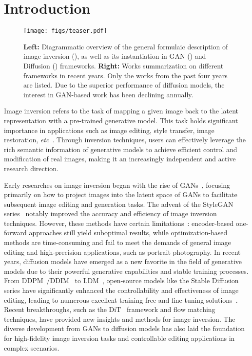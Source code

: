 \section{Introduction} \label{sec:introduction}



\begin{figure*}[thp]
    \centering
    \texttt{[image: figs/teaser.pdf]}
    \vspace{-2.0em}
    \caption{
    \textbf{Left:} Diagrammatic overview of the general formulaic description of image inversion (\textbf{\uppercase\expandafter{}}), as well as its instantiation in GAN (\textbf{\uppercase\expandafter{}}) and Diffusion (\textbf{\uppercase\expandafter{}}) frameworks. 
    \textbf{Right:} Works summarization on different frameworks in recent years. 
    Only the works from the past four years are listed. Due to the superior performance of diffusion models, the interest in GAN-based work has been declining annually. 
    }
    \vspace{-1.5em}
    \label{fig:teaser}
\end{figure*}


Image inversion refers to the task of mapping a given image back to the latent representation with a pre-trained generative model. This task holds significant importance in applications such as image editing, style transfer, image restoration, \textit{etc}~\cite{survey1,survey2}. Through inversion techniques, users can effectively leverage the rich semantic information of generative models to achieve efficient control and modification of real images, making it an increasingly independent and active research direction.

Early researches on image inversion began with the rise of GANs~\cite{iGAN}, focusing primarily on how to project images into the latent space of GANs to facilitate subsequent image editing and generation tasks. The advent of the StyleGAN series~\cite{StyleGAN,StyleGAN2} notably improved the accuracy and efficiency of image inversion techniques. However, these methods have certain limitations~\cite{e4e,PTI,SDIC}: encoder-based one-forward approaches still yield suboptimal results, while optimization-based methods are time-consuming and fail to meet the demands of general image editing and high-precision applications, such as portrait photography. 
In recent years, diffusion models have emerged as a new favorite in the field of generative models due to their powerful generative capabilities and stable training processes. From DDPM~\cite{DDPM}/DDIM~\cite{DDIM} to LDM~\cite{LDM}, open-source models like the Stable Diffusion series have significantly enhanced the controllability and effectiveness of image editing, leading to numerous excellent training-free and fine-tuning solutions~\cite{Negative-prompt,StyleID,FreeControl}. Recent breakthroughs, such as the DiT~\cite{DiT} framework and flow matching techniques, have provided new insights and methods for image inversion. The diverse development from GANs to diffusion models has also laid the foundation for high-fidelity image inversion tasks and controllable editing applications in complex scenarios.

